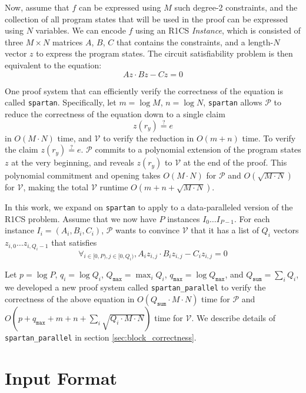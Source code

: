 \documentclass{article}
\newcommand{\code}{\texttt}
\newcommand{\Qsum}{Q_{\mathtt{sum}}}
\newcommand{\Qmax}{Q_{\mathtt{max}}}
\newcommand{\qmax}{q_{\mathtt{max}}}
\renewcommand{\P}{\mathcal{P}}
\newcommand{\V}{\mathcal{V}}
\newcommand{\eqq}{\stackrel{?}{=}}
\begin{document}
Now, assume that $f$ can be expressed using $M$ such degree-2 constraints, and the collection of all program states that will be used in the proof can be expressed using $N$ variables. We can encode $f$ using an R1CS \emph{Instance}, which is consisted of three $M\times N$ matrices $A$, $B$, $C$ that contains the constraints, and a length-$N$ vector $z$ to express the program states. The circuit satisfiability problem is then equivalent to the equation:
$$Az \cdot Bz - Cz = 0$$

One proof system that can efficiently verify the correctness of the equation is called \code{spartan}. Specifically, let $m = \log M$, $n = \log N$, \code{spartan} allows $\P$ to reduce the correctness of the equation down to a single claim
$$z(r_y) \eqq e$$
in $O(M\cdot N)$ time, and $\V$ to verify the reduction in $O(m + n)$ time. To verify the claim $z(r_y) \eqq e$. $\P$ commits to a polynomial extension of the program states $z$ at the very beginning, and reveals $z(r_y)$ to $\V$ at the end of the proof. This polynomial commitment and opening takes $O(M\cdot N)$ for $\P$ and $O(\sqrt{M\cdot N})$ for $\V$, making the total $\V$ runtime $O(m + n + \sqrt{M\cdot N})$.

In this work, we expand on \code{spartan} to apply to a data-paralleled version of the R1CS problem. Assume that we now have $P$ instances $I_0\dots I_{P-1}$. For each instance $I_i = (A_i, B_i, C_i)$, $\P$ wants to convince $\V$ that it has a list of $Q_i$ vectors $z_{i, 0}\dots z_{i, Q_i-1}$ that satisfies
$$\forall_{i\in [0, P), j \in [0, Q_i)}, A_iz_{i, j} \cdot B_iz_{i, j} - C_iz_{i, j} = 0$$

Let $p = \log P$, $q_i = \log Q_i$, $\Qmax = \max_i Q_i$, $\qmax = \log \Qmax$, and $\Qsum = \sum_i Q_i$, we developed a new proof system called \code{spartan\_parallel} to verify the correctness of the above equation in $O(\Qsum \cdot M \cdot N)$ time for $\P$ and $O(p + \qmax + m + n + \sum_i \sqrt{Q_i\cdot M\cdot N})$ time for $\V$. We describe details of \code{spartan\_parallel} in section \ref{sec:block_correctness}.


\section{Input Format}\label{sec:input}
\end{document}
